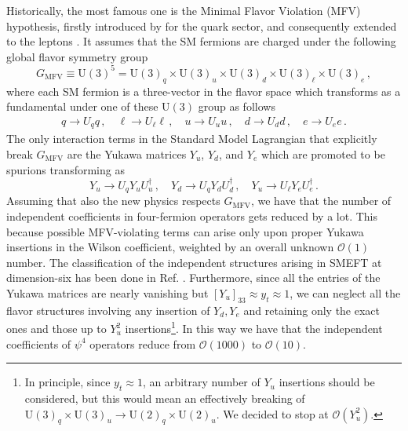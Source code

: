 \documentclass[a4paper,11pt]{article}
\begin{document}
Historically, the most famous one is the Minimal Flavor Violation (MFV) hypothesis, firstly introduced by \cite{DAmbrosio:2002vsn} for the quark sector, and consequently extended to the leptons \cite{Cirigliano:2005ck}. It assumes that the SM fermions are charged under the following global flavor symmetry group
\begin{equation}
    G_{\text{MFV}}\equiv\mathrm{U}(3)^5=\mathrm{U}(3)_q\times\mathrm{U}(3)_u\times\mathrm{U}(3)_d\times\mathrm{U}(3)_\ell\times\mathrm{U}(3)_e\,,
\end{equation}
where each SM fermion is a three-vector in the flavor space which transforms as a fundamental under one of these $\mathrm{U}(3)$ group as follows
\begin{align}
    q\to U_q q\,,\quad \ell\to U_\ell \ell\,,\quad u\to U_u u\,,\quad d\to U_d d\,,\quad e\to U_e e\,.
\end{align}
The only interaction terms in the Standard Model Lagrangian that explicitly break $G_{\text{MFV}}$ are the Yukawa matrices $Y_u$, $Y_d$, and $Y_e$ which are promoted to be spurions transforming as
\begin{equation}
    Y_u\to U_q Y_u U_u^\dag\,,\quad Y_d\to U_q Y_d U_d^\dag\,,\quad Y_u\to U_\ell Y_e U_e^\dag\,.
\end{equation}
Assuming that also the new physics respects $G_{\text{MFV}}$, we have that the number of independent coefficients in four-fermion operators gets reduced by a lot. This because possible MFV-violating terms can arise only upon proper Yukawa insertions in the Wilson coefficient, weighted by an overall unknown $\mathcal{O}(1)$ number. The classification of the independent structures arising in SMEFT at dimension-six has been done in Ref. \cite{Faroughy:2020ina}. Furthermore, since all the entries of the Yukawa matrices are nearly vanishing but $[Y_u]_{33}\approx y_t\approx 1$, we can neglect all the flavor structures involving any insertion of $Y_d,Y_e$ and retaining only the exact ones and those up to $Y_u^2$ insertions\footnote{In principle, since $y_t\approx1$, an arbitrary number of $Y_u$ insertions should be considered, but this would mean an effectively breaking of $\mathrm{U}(3)_q\times \mathrm{U}(3)_u\to \mathrm{U}(2)_q\times \mathrm{U}(2)_u$. We decided to stop at $\mathcal{O}(Y_u^2)$.}. In this way we have that the independent coefficients of $\psi^4$ operators reduce from $\mathcal{O}(1000)$ to $\mathcal{O}(10)$. 
\end{document}
